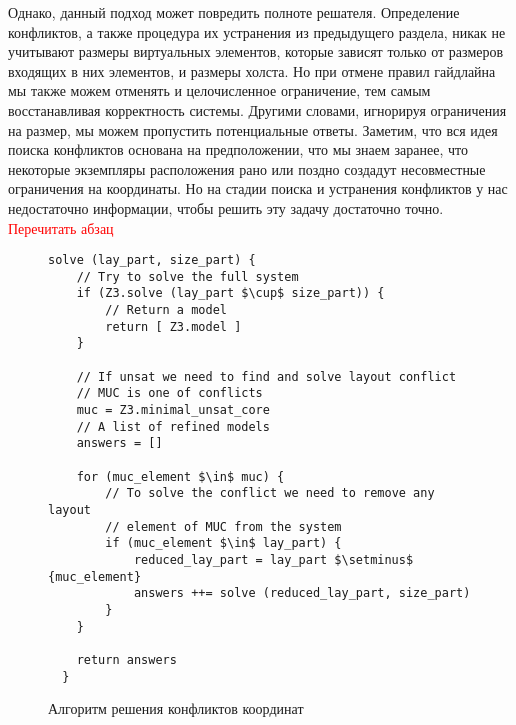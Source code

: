 Однако, данный подход может повредить полноте решателя.
Определение конфликтов, а также процедура их устранения из предыдущего раздела, никак не учитывают размеры виртуальных элементов, которые зависят только от размеров входящих в них элементов, и размеры холста.
Но при отмене правил  гайдлайна мы также можем отменять и целочисленное ограничение, тем самым восстанавливая корректность системы.
Другими словами, игнорируя ограничения на размер, мы можем пропустить потенциальные ответы.
Заметим, что вся идея поиска конфликтов основана на предположении, что мы знаем заранее, что некоторые экземпляры расположения рано или поздно создадут несовместные ограничения на координаты. Но на стадии поиска и устранения конфликтов у нас недостаточно информации, чтобы решить эту задачу достаточно точно.
\textcolor{red}{Перечитать абзац}


\begin{figure*}
\begin{lstlisting}[language=algo,mathescape=true,basicstyle=\ttfamily]
  solve (lay_part, size_part) {
    // Try to solve the full system
    if (Z3.solve (lay_part $\cup$ size_part)) {
        // Return a model
        return [ Z3.model ]
    }

    // If unsat we need to find and solve layout conflict
    // MUC is one of conflicts
    muc = Z3.minimal_unsat_core
    // A list of refined models
    answers = []

    for (muc_element $\in$ muc) {
        // To solve the conflict we need to remove any layout
        // element of MUC from the system
        if (muc_element $\in$ lay_part) {
            reduced_lay_part = lay_part $\setminus$ {muc_element}
            answers ++= solve (reduced_lay_part, size_part)
        }
    }

    return answers
  }
\end{lstlisting}
\caption{Алгоритм решения конфликтов координат}
\label{Z3op}
\end{figure*}

